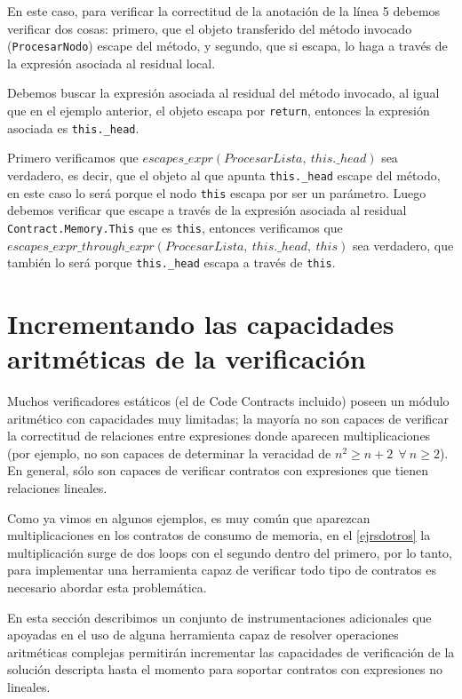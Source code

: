 \documentclass[12pt,a4paper]{article}
\newcommand\mono[1]{\texttt{#1}}
\begin{document}
			En este caso, para verificar la correctitud de la anotación de la línea 5 debemos verificar dos cosas: primero, que el objeto transferido del método invocado (\mono{ProcesarNodo}) escape del método, y segundo, que si escapa, lo haga a través de la expresión asociada al residual local.

			Debemos buscar la expresión asociada al residual del método invocado, al igual que en el ejemplo anterior, el objeto escapa por \mono{return}, entonces la expresión asociada es \mono{this.\_head}.

			Primero verificamos que $escapes\_expr(ProcesarLista,\ this.\_head)$ sea verdadero, es decir, que el objeto al que apunta \mono{this.\_head} escape del método, en este caso lo será porque el nodo \mono{this} escapa por ser un parámetro. Luego debemos verificar que escape a través de la expresión asociada al residual \mono{Contract.Memory.This} que es \mono{this}, entonces verificamos que $escapes\_expr\_through\_expr(ProcesarLista,\ this.\_head,\ this)$ sea verdadero, que también lo será porque \mono{this.\_head} escapa a través de \mono{this}.

	\newpage
	\section{Incrementando las capacidades aritméticas de la verificación} \label{sec:mejbarv}
		Muchos verificadores estáticos (el de Code Contracts incluido) poseen un módulo aritmético con capacidades muy limitadas; la mayoría no son capaces de verificar la correctitud de relaciones entre expresiones donde aparecen multiplicaciones (por ejemplo, no son capaces de determinar la veracidad de $n^2 \geq n + 2\ \ \forall\ n \geq 2$). En general, sólo son capaces de verificar contratos con expresiones que tienen relaciones lineales.

		Como ya vimos en algunos ejemplos, es muy común que aparezcan multiplicaciones en los contratos de consumo de memoria, en el \autoref{ejrsdotros} la multiplicación surge de dos loops con el segundo dentro del primero, por lo tanto, para implementar una herramienta capaz de verificar todo tipo de contratos es necesario abordar esta problemática.

		En esta sección describimos un conjunto de instrumentaciones adicionales que apoyadas en el uso de alguna herramienta capaz de resolver operaciones aritméticas complejas permitirán incrementar las capacidades de verificación de la solución descripta hasta el momento para soportar contratos con expresiones no lineales.
\end{document}

